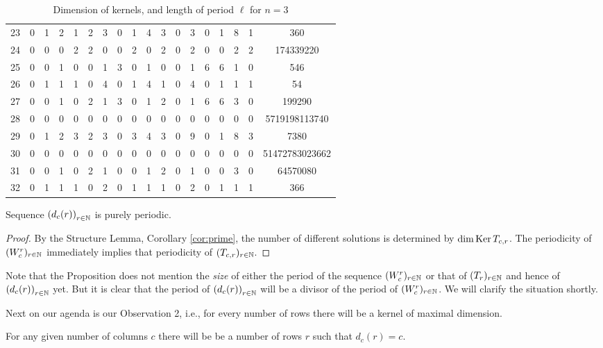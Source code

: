 \begin{table}
\begin{center}
\begin{adjustbox}{max width=\textwidth}
\begin{tabular}{|c|cccccccccccccccc|c|}
23 &0 &1 &2 &1 &2 &3 &0 &1 &4 &3 &0 &3 &0 &1 &8 &1 &360\\
24 &0 &0 &0 &2 &2 &0 &0 &2 &0 &2 &0 &2 &0 &0 &2 &2 &174339220\\
25 &0 &0 &1 &0 &0 &1 &3 &0 &1 &0 &0 &1 &6 &6 &1 &0 &546\\
26 &0 &1 &1 &1 &0 &4 &0 &1 &4 &1 &0 &4 &0 &1 &1 &1 &54\\
27 &0 &0 &1 &0 &2 &1 &3 &0 &1 &2 &0 &1 &6 &6 &3 &0 &199290\\
28 &0 &0 &0 &0 &0 &0 &0 &0 &0 &0 &0 &0 &0 &0 &0 &0 &5719198113740\\
29 &0 &1 &2 &3 &2 &3 &0 &3 &4 &3 &0 &9 &0 &1 &8 &3 &7380\\
30 &0 &0 &0 &0 &0 &0 &0 &0 &0 &0 &0 &0 &0 &0 &0 &0 &51472783023662\\
31 &0 &0 &1 &0 &2 &1 &0 &0 &1 &2 &0 &1 &0 &0 &3 &0 &64570080\\
32 &0 &1 &1 &1 &0 &2 &0 &1 &1 &1 &0 &2 &0 &1 &1 &1 &366\\
\hline
\end{tabular}
\end{adjustbox}
\end{center}
\caption{Dimension of kernels, and length of period $\ell$ for $n=3$}
\end{table}

\begin{proposition}[Observation 1]
Sequence $\left(d_{c}(r)\right)_{r\in\mathbb{N}}$ is purely periodic.
\end{proposition}

\begin{proof}
By the Structure Lemma, Corollary \ref{cor:prime},
the number of different solutions is determined by 
$\dim\operatorname{Ker} T_{c,r}$.
  The periodicity of $(W_{c}^{r})_{r\in\mathbb{N}}$ immediately implies that
  periodicity of $(T_{c,r})_{r\in\mathbb{N}}$.
\end{proof}
Note that the Proposition does not mention the {\it size} of either the period
of the sequence $(W_{c}^{r})_{r\in\mathbb{N}}$ or that of $(T_{r})_{r\in\mathbb{N}}$
and hence of $\left(d_{c}(r)\right)_{r\in\mathbb{N}}$ yet. But it is clear that
the period of $\left(d_{c}(r)\right)_{r\in\mathbb{N}}$
will be a divisor of the period of $(W_{c}^{r})_{r\in\mathbb{N}}$. 
We will clarify the situation shortly.

Next on our agenda is our Observation 2, i.e., for
every number of rows there will be a kernel of maximal dimension.

\begin{lemma}[Observation 2]\label{lem:max}
For any given number of columns $c$ there will be be a number of rows $r$
such that $d_c(r)=c$.
\end{lemma}

